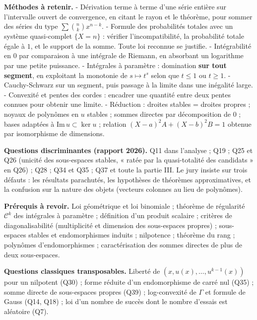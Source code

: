 \documentclass[11pt,a4paper]{article}
\begin{document}
\textbf{Méthodes à retenir.}
- Dérivation terme à terme d'une série entière sur l'intervalle ouvert de convergence, en citant le rayon et le théorème, pour sommer des séries du type \(\sum\binom nkx^{n-k}\).
- Formule des probabilités totales avec un système quasi-complet \(\{X=n\}\) : vérifier l'incompatibilité, la probabilité totale égale à \(1\), et le support de la somme. Toute loi reconnue se justifie.
- Intégrabilité en \(0\) par comparaison à une intégrale de Riemann, en absorbant un logarithme par une petite puissance.
- Intégrales à paramètre : domination \textbf{sur tout segment}, en exploitant la monotonie de \(s\mapsto t^s\) selon que \(t\le1\) ou \(t\ge1\).
- Cauchy-Schwarz sur un segment, puis passage à la limite dans une inégalité large.
- Convexité et pentes des cordes : encadrer une quantité entre deux pentes connues pour obtenir une limite.
- Réduction : droites stables = droites propres ; noyaux de polynômes en \(u\) stables ; sommes directes par décomposition de \(0\) ; bases adaptées à \(\mathrm{Im}\,u\subset\ker u\) ; relation \((X-a)^2A+(X-b)^2B=1\) obtenue par isomorphisme de dimensions.

\textbf{Questions discriminantes (rapport 2026).} Q11 dans l'analyse ; Q19 ; Q25 et Q26 (unicité des sous-espaces stables, « ratée par la quasi-totalité des candidats » en Q26) ; Q28 ; Q34 et Q35 ; Q37 et toute la partie III. Le jury insiste sur trois défauts : les résultats parachutés, les hypothèses de théorèmes approximatives, et la confusion sur la nature des objets (vecteurs colonnes au lieu de polynômes).

\textbf{Prérequis à revoir.} Loi géométrique et loi binomiale ; théorème de régularité \(\mathcal C^k\) des intégrales à paramètre ; définition d'un produit scalaire ; critères de diagonalisabilité (multiplicité et dimension des sous-espaces propres) ; sous-espaces stables et endomorphismes induits ; nilpotence ; théorème du rang ; polynômes d'endomorphismes ; caractérisation des sommes directes de plus de deux sous-espaces.

\textbf{Questions classiques transposables.} Liberté de \((x,u(x),\dots,u^{k-1}(x))\) pour un nilpotent (Q30) ; forme réduite d'un endomorphisme de carré nul (Q35) ; somme directe de sous-espaces propres (Q39) ; log-convexité de \(\Gamma\) et formule de Gauss (Q14, Q18) ; loi d'un nombre de succès dont le nombre d'essais est aléatoire (Q7).
\end{document}

